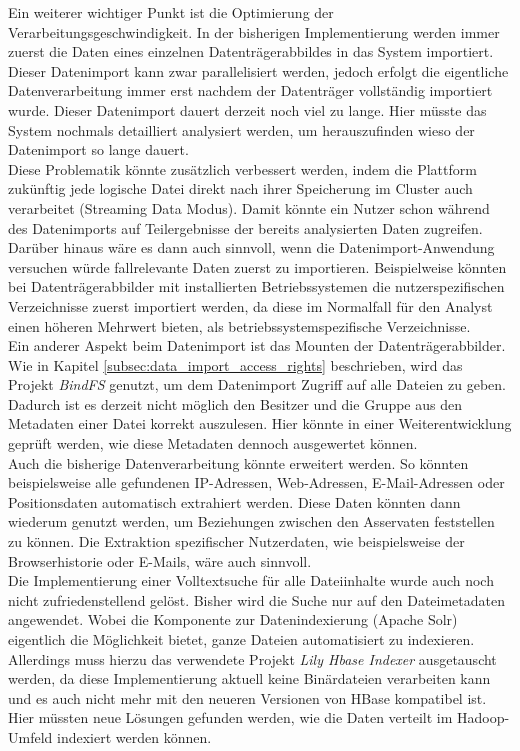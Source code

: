 \noindent
Ein weiterer wichtiger Punkt ist die Optimierung der Verarbeitungsgeschwindigkeit. In der bisherigen Implementierung werden immer zuerst die Daten eines einzelnen Datenträgerabbildes in das System importiert. Dieser Datenimport kann zwar parallelisiert werden, jedoch erfolgt die eigentliche Datenverarbeitung immer erst nachdem der Datenträger vollständig importiert wurde. Dieser Datenimport dauert derzeit noch viel zu lange. Hier müsste das System nochmals detailliert analysiert werden, um herauszufinden wieso der Datenimport so lange dauert. \\
Diese Problematik könnte zusätzlich verbessert werden, indem die Plattform zukünftig jede logische Datei direkt nach ihrer Speicherung im Cluster auch verarbeitet (Streaming Data Modus). Damit könnte ein Nutzer schon während des Datenimports auf Teilergebnisse der bereits analysierten Daten zugreifen. Darüber hinaus wäre es dann auch sinnvoll, wenn die Datenimport-Anwendung versuchen würde fallrelevante Daten zuerst zu importieren. Beispielweise könnten bei Datenträgerabbilder mit installierten Betriebssystemen die nutzerspezifischen Verzeichnisse zuerst importiert werden, da diese im Normalfall für den Analyst einen höheren Mehrwert bieten, als betriebssystemspezifische Verzeichnisse.\\
Ein anderer Aspekt beim Datenimport ist das Mounten der Datenträgerabbilder. Wie in Kapitel \ref{subsec:data_import_access_rights} beschrieben, wird das Projekt \textit{BindFS} genutzt, um dem Datenimport Zugriff auf alle Dateien zu geben. Dadurch ist es derzeit nicht möglich den Besitzer und die Gruppe aus den Metadaten einer Datei korrekt auszulesen. Hier könnte in einer Weiterentwicklung geprüft werden, wie diese Metadaten dennoch ausgewertet können.\\

\noindent
Auch die bisherige Datenverarbeitung könnte erweitert werden. So könnten beispielsweise alle gefundenen IP-Adressen, Web-Adressen, E-Mail-Adressen oder Positionsdaten automatisch extrahiert werden. Diese Daten könnten dann wiederum genutzt werden, um Beziehungen zwischen den Asservaten feststellen zu können.
Die Extraktion spezifischer Nutzerdaten, wie beispielsweise der Browserhistorie oder E-Mails, wäre auch sinnvoll.\\

\noindent
Die Implementierung einer Volltextsuche für alle Dateiinhalte wurde auch noch nicht zufriedenstellend gelöst. Bisher wird die Suche nur auf den Dateimetadaten angewendet. Wobei die Komponente zur Datenindexierung (Apache Solr) eigentlich die Möglichkeit bietet, ganze Dateien automatisiert zu indexieren. Allerdings muss hierzu das verwendete Projekt \textit{Lily Hbase Indexer} ausgetauscht werden, da diese Implementierung aktuell keine Binärdateien verarbeiten kann und es auch nicht mehr mit den neueren Versionen von HBase kompatibel ist. Hier müssten neue Lösungen gefunden werden, wie die Daten verteilt im Hadoop-Umfeld indexiert werden können.\\

